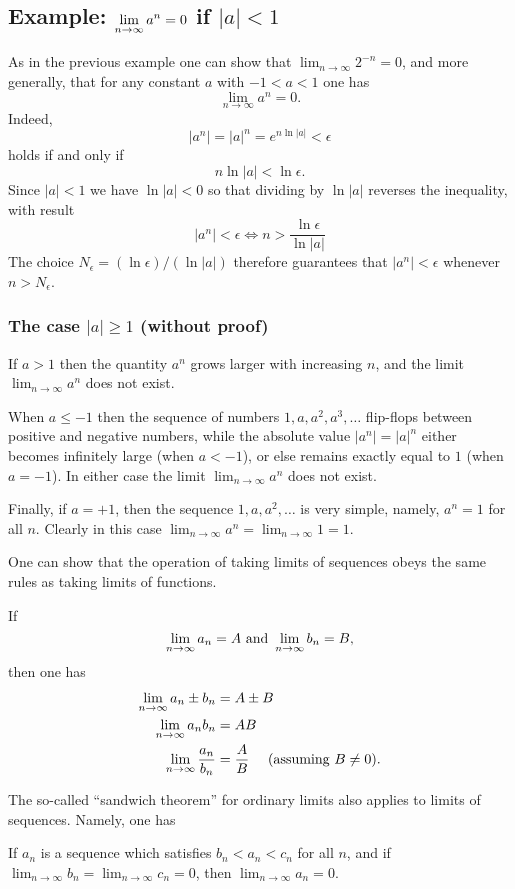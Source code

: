 \subsection{Example: $\displaystyle\lim_{n\to\infty} a^n=0$ if $|a|<1$} %

As in the previous example one can show that $\lim_{n\to\infty} 2^{-n}=0$, and more
generally, that for any constant $a$ with $-1<a<1$ one has
\[
\lim_{n\to\infty} a^n = 0.
\]
Indeed,
\[
|a^n|=|a|^n = e^{n\ln|a|}<\epsilon
\]
holds if and only if
\[
n\ln |a|<\ln\epsilon.
\]
Since $|a|<1$ we have $\ln |a|<0$ so that dividing by $\ln|a|$ reverses the
inequality, with result
\[
|a^n|<\epsilon \iff n>\frac{\ln \epsilon}{\ln|a|}
\]
The choice $N_\epsilon = (\ln \epsilon)/ (\ln|a|)$ therefore guarantees
that $|a^n|<\epsilon$ whenever $n>N_\epsilon$.

\subsubsection*{The case $|a|\geq 1$ (without proof)}
If $a>1$ then the quantity $a^n$ grows larger with increasing $n$, and the limit
$\lim_{n\to\infty}a^n$ does not exist.  

When $a\leq -1$ then the sequence of numbers $1, a, a^2, a^3, \ldots$ flip-flops
between positive and negative numbers, while the absolute value $|a^n| = |a|^n$
either becomes infinitely large (when $a<-1$), or else remains exactly equal to
$1$ (when $a=-1$).  In either case the limit $\lim_{n\to\infty} a^n$ does not
exist.  

Finally, if $a=+1$, then the sequence $1, a, a^2, \ldots$ is very simple,
namely, $a^n=1$ for all $n$.  Clearly in this case $\lim_{n\to\infty}a^n =
\lim_{n\to\infty} 1 = 1$.

One can show that the operation of taking limits of sequences obeys the
same rules as taking limits of functions.
\begin{theorem}
  If
  \[
  \lim_{n\to\infty}a_n = A \text{ and } \lim_{n\to\infty} b_n =B,
  \]
  then one has
  \begin{align*}
    \lim_{n\to\infty} a_n \pm b_n &= A\pm B \\
    \lim_{n\to\infty} a_n  b_n &= A B \\
    \lim_{n\to\infty} \frac{a_n}{ b_n} &= \frac{A}{ B}\quad\text{ (assuming
    $B\neq0$).}
  \end{align*}
\end{theorem}

The so-called ``sandwich theorem'' for ordinary limits also applies to
limits of sequences.  Namely, one has
\begin{theorem}
   If $a_n$ is a sequence which satisfies
  $b_n<a_n<c_n$ for all $n$, and if $\lim_{n\to\infty} b_n=\lim_{n\to\infty} c_n=0$, then
  $\lim_{n\to\infty} a_n=0$.
\end{theorem}
\medskip

